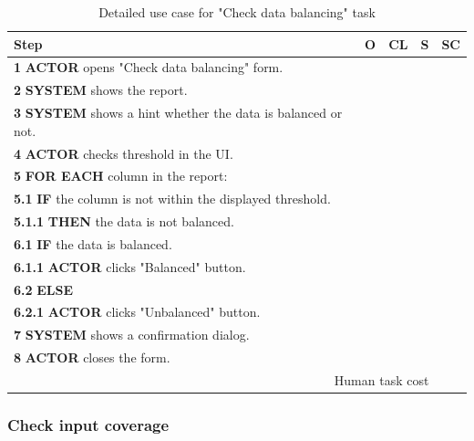 \begin{table}[H]
\centering
\begin{tabularx}{\textwidth}{|X|c|c|c|c|}
\hline
\textbf{Step} & \textbf{O} & \textbf{CL} & \textbf{S} & \textbf{SC} \\
\hline
\textbf{1} \textbf{ACTOR} opens "Check data balancing" form. & & & & \\
\hline
\textbf{2} \textbf{SYSTEM} shows the report. & & & & \\
\hline
\textbf{3} \textbf{SYSTEM} shows a hint whether the data is balanced or not. & & & & \\
\hline
\textbf{4} \textbf{ACTOR} checks threshold in the UI. & & & & \\
\hline
\textbf{5} \textbf{FOR EACH} column in the report: & & & & \\
\hline
\textbf{5.1} \textbf{IF} the column is not within the displayed threshold. & & & & \\
\hline
\textbf{5.1.1} \textbf{THEN} the data is not balanced. & & & & \\
\hline
\textbf{6.1} \textbf{IF} the data is balanced. & & & & \\
\hline
\textbf{6.1.1} \textbf{ACTOR} clicks "Balanced" button. & & & & \\
\hline
\textbf{6.2} \textbf{ELSE} & & & & \\
\hline
\textbf{6.2.1} \textbf{ACTOR} clicks "Unbalanced" button. & & & & \\
\hline
\textbf{7} \textbf{SYSTEM} shows a confirmation dialog. & & & & \\
\hline
\textbf{8} \textbf{ACTOR} closes the form. & & & & \\
\hline
\multicolumn{4}{|r|}{Human task cost} & \\
\hline
\end{tabularx}
\caption{Detailed use case for "Check data balancing" task}
\label{table:check_data_balancing}
\end{table}

\subsubsection{Check input coverage}

